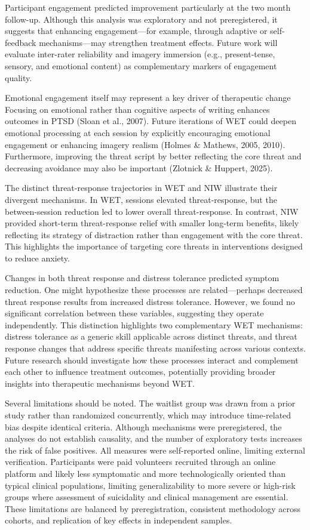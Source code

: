 \documentclass[
  man,floatsintext]{apa7}
\begin{document}
Participant engagement predicted improvement particularly at the two month follow-up.
Although this analysis was exploratory and not preregistered, it suggests that enhancing engagement---for example, through adaptive or self-feedback mechanisms---may strengthen treatment effects.
Future work will evaluate inter-rater reliability and imagery immersion (e.g., present-tense, sensory, and emotional content) as complementary markers of engagement quality.

Emotional engagement itself may represent a key driver of therapeutic change
Focusing on emotional rather than cognitive aspects of writing enhances outcomes in PTSD (Sloan et al., 2007).
Future iterations of WET could deepen emotional processing at each session by explicitly encouraging emotional engagement or enhancing imagery realism (Holmes \& Mathews, 2005, 2010).
Furthermore, improving the threat script by better reflecting the core threat and decreasing avoidance may also be important (Zlotnick \& Huppert, 2025).

The distinct threat-response trajectories in WET and NIW illustrate their divergent mechanisms.
In WET, sessions elevated threat-response, but the between-session reduction led to lower overall threat-response.
In contrast, NIW provided short-term threat-response relief with smaller long-term benefits, likely reflecting its strategy of distraction rather than engagement with the core threat.
This highlights the importance of targeting core threats in interventions designed to reduce anxiety.

Changes in both threat response and distress tolerance predicted symptom reduction.
One might hypothesize these processes are related---perhaps decreased threat response results from increased distress tolerance.
However, we found no significant correlation between these variables, suggesting they operate independently.
This distinction highlights two complementary WET mechanisms: distress tolerance as a generic skill applicable across distinct threats, and threat response changes that address specific threats manifesting across various contexts.
Future research should investigate how these processes interact and complement each other to influence treatment outcomes, potentially providing broader insights into therapeutic mechanisms beyond WET.

Several limitations should be noted.
The waitlist group was drawn from a prior study rather than randomized concurrently, which may introduce time-related bias despite identical criteria.
Although mechanisms were preregistered, the analyses do not establish causality, and the number of exploratory tests increases the risk of false positives.
All measures were self-reported online, limiting external verification.
Participants were paid volunteers recruited through an online platform and likely less symptomatic and more technologically oriented than typical clinical populations, limiting generalizability to more severe or high-risk groups where assessment of suicidality and clinical management are essential.
These limitations are balanced by preregistration, consistent methodology across cohorts, and replication of key effects in independent samples.
\end{document}
